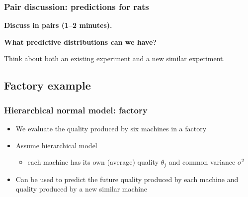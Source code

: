 \documentclass[10pt]{beamer}
\begin{document}
\begin{frame}
\frametitle{Pair discussion: predictions for rats}

  {\color{uured}\textbf{Discuss in pairs (1--2 minutes).}}

  \textbf{What predictive distributions can we have?}

  Think about both an existing experiment and a new similar experiment.

\end{frame}

\subsection{Factory example}

\begin{frame}

\frametitle{Hierarchical normal model: factory}

  \begin{itemize}
  \item We evaluate the quality produced by six machines in a factory
  \item Assume hierarchical model
    \begin{itemize}
    \item each machine has its own (average) quality $\theta_j$ and
      {\color{uured} common variance} $\sigma^2$
    \end{itemize}
\begin{minipage}[b]{4cm}
\begin{xy}
\end{xy}
    \end{minipage}
  \item Can be used to predict the future quality produced by each machine and quality produced by a new similar machine
  \end{itemize}
\end{frame}
\end{document}
